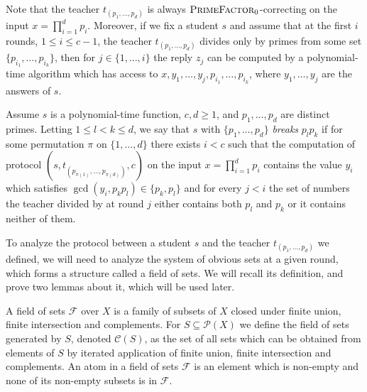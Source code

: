 \documentclass{lmcs}
\renewcommand{\P}{\mathcal{P}}
\newcommand{\F}{\mathcal{F}}
\newcommand{\C}{\mathcal{C}}
\newcommand{\PrimeFactor}{\textsc{PrimeFactor}}
\begin{document}
Note that the teacher $t_{(p_1,\dots,p_d)}$ is always $\PrimeFactor_0$-correcting on the input $x=\prod_{i=1}^d p_i$. Moreover, if we fix a student $s$ and assume that at the first $i$ rounds, $1\leq i \leq c-1$, the teacher $t_{(p_1,\dots,p_d)}$ divides only by primes from some set $\{p_{i_1},\dots,p_{i_k}\}$, then for $j\in\{1,\dots,i\}$ the reply $z_j$ can be computed by a polynomial-time algorithm which has access to $x,y_1,\dots,y_j,p_{i_1},\dots,p_{i_k}$, where $y_1,\dots,y_j$ are the answers of $s$.

\begin{defi}
    Assume $s$ is a polynomial-time function, $c,d\geq 1$, and $p_1,\dots,p_d$ are distinct primes. Letting $1\leq l <k \leq d$, we say that $s$ with $\{p_1,\dots,p_d\}$ \emph{breaks} $p_lp_k$ if for some permutation $\pi$ on $\{1,\dots,d\}$ there exists $i<c$ such that the computation of protocol $(s,t_{(p_{\pi(1)},\dots, p_{\pi(d)})},c)$ on the input $x=\prod_{i=1}^d p_i$ contains the value $y_i$ which satisfies $\gcd(y_i,p_kp_l)\in\{p_k, p_l\}$ and for every $j<i$ the set of numbers the teacher divided by at round $j$ either contains both $p_l$ and $p_k$ or it contains neither of them.
\end{defi}

To analyze the protocol between a student $s$ and the teacher $t_{(p_1,\dots,p_d)}$ we defined, we will need to analyze the system of obvious sets at a given round, which forms a structure called a field of sets. We will recall its definition, and prove two lemmas about it, which will be used later.

\begin{defi}
    A field of sets $\F$ over $X$ is a family of subsets of $X$ closed under finite union, finite intersection and complements. For $S \subseteq \P(X)$ we define the field of sets generated by $S$, denoted $\C(S)$, as the set of all sets which can be obtained from elements of $S$ by iterated application of finite union, finite intersection and complements. An atom in a field of sets $\F$ is an element which is non-empty and none of its non-empty subsets is in $\F$.
\end{defi}
\end{document}
